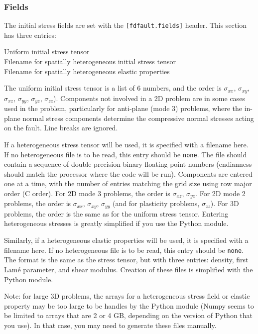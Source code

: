\documentclass[12pt]{article}   	%
\begin{document}
\subsubsection{Fields}

The initial stress fields are set with the {\tt [fdfault.fields]} header. This section has three entries:

\vspace{0.1in}
Uniform initial stress tensor \\
\indent Filename for spatially heterogeneous initial stress tensor \\
\indent Filename for spatially heterogeneous elastic properties

\vspace{0.1in}
\noindent The uniform initial stress tensor is a list of 6 numbers, and the order is $\sigma_{xx}$, $\sigma_{xy}$, $\sigma_{xz}$, $\sigma_{yy}$, $\sigma_{yz}$, $\sigma_{zz}$). Components not involved in a 2D problem are in some cases used in the problem, particularly for anti-plane (mode 3) problems, where the in-plane normal stress components determine the compressive normal stresses acting on the fault. Line breaks are ignored.

If a heterogeneous stress tensor will be used, it is specified with a filename here. If no heterogeneous file is to be read, this entry should be {\tt none}. The file should contain a sequence of double precision binary floating point numbers (endianness should match the processor where the code will be run). Components are entered one at a time, with the number of entries matching the grid size using row major order (C order). For 2D mode 3 problems, the order is $\sigma_{xz}$, $\sigma_{yz}$. For 2D mode 2 problems, the order is $\sigma_{xx}$, $\sigma_{xy}$, $\sigma_{yy}$ (and for plasticity problems, $\sigma_{zz}$). For 3D problems, the order is the same as for the uniform stress tensor. Entering heterogeneous stresses is greatly simplified if you use the Python module.

Similarly, if a heterogeneous elastic properties will be used, it is specified with a filename here. If no heterogeneous file is to be read, this entry should be {\tt none}. The format is the same as the stress tensor, but with three entries: density, first Lam\'{e} parameter, and shear modulus. Creation of these files is simplified with the Python module.

Note: for large 3D problems, the arrays for a heterogeneous stress field or elastic property may be too large to be handles by the Python module (Numpy seems to be limited to arrays that are 2 or 4 GB, depending on the version of Python that you use). In that case, you may need to generate these files manually.
\end{document}
